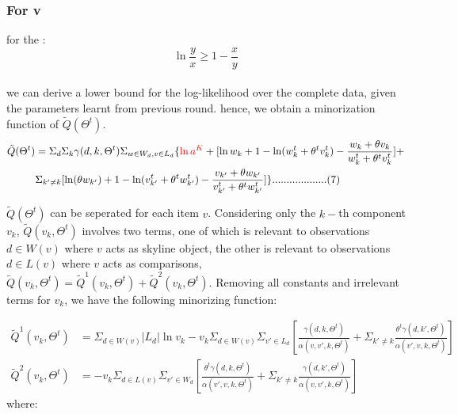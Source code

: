 \documentclass{article}
\begin{document}
\subsubsection{For v}
for the :
\begin{equation*}
\ln \frac{y}{x} \geq 1- \frac{x}{y}
\end{equation*}\\
we can derive a lower bound for the log-likelihood over the complete data, given the parameters learnt from previous round.
hence, we obtain a minorization function of $\tilde{Q}(\Theta^t)$.\\
\begin{equation}
\begin{aligned}
\tilde{Q}(\Theta^t) &=\Sigma_d \Sigma_k \gamma(d,k,\Theta^t) \Sigma_{w\in W_d, v\in L_d}  \{\textcolor{red}{\ln a^K} + [\ln w_k + 1 - \ln (w_k^t + \theta^t v_k^t) - \frac{w_k+\theta v_k}{w_k^t + \theta^tv_k^t}]+\\\nonumber
&\Sigma_{k'\neq k} [\ln (\theta w_{k'}) + 1 - \ln (v_{k'}^t + \theta^t w_{k'}^t) -  \frac{v_{k'}+\theta w_{k'}}{v_{k'}^t + \theta^t w_{k'}^t}]
\} ...................(7)
\end{aligned}
\end{equation}


 $\tilde{Q}(\Theta^t)$ can be seperated for each item $v$. Considering only the $k-$th component $v_k$, $\tilde{Q}(v_k,\Theta^t)$ involves two terms, one of which is relevant to observations $d\in W(v)$ where $v$ acts as skyline object, the other is relevant to observations $d \in L(v)$ where $v$ acts as comparisons, $\tilde{Q}(v_k,\Theta^t)=\tilde{Q}^1(v_k,\Theta^t)+\tilde{Q}^2(v_k,\Theta^t)$. Removing all constants and irrelevant terms for $v_k$, we have the following minorizing function:


\begin{equation}
\begin{aligned}
\tilde{Q}^1(v_k,\Theta^t) & =\Sigma_{d\in W(v)} |L_d| \ln v_k -v_k\Sigma_{d\in W(v)}\Sigma_{v'\in L_d} [\frac{\gamma(d,k,\Theta^t)}{ \alpha(v,v',k,\Theta^t)} +\Sigma_{k'\neq k}\frac{\theta^t\gamma(d,k',\Theta^t)}{\alpha(v',v,k,\Theta^t)}]\\ \nonumber
\tilde{Q}^2(v_k,\Theta^t) & =-v_k \Sigma_{d\in L(v)}\Sigma_{v'\in W_d} [\frac{\theta^t \gamma(d,k,\Theta^t)}{\alpha(v',v,k,\Theta^t)}+\Sigma_{k'\neq k} \frac{\gamma(d,k',\Theta^t)}{\alpha(v,v',k,\Theta^t)}]
\end{aligned}
\end{equation}
 where:\\
\end{document}
